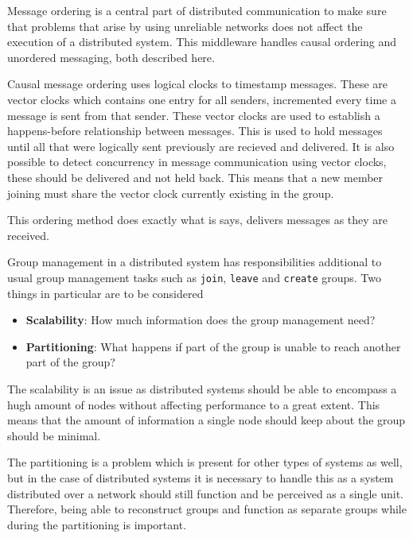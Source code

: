 
	Message ordering is a central part of distributed communication to make sure that problems that arise by using unreliable networks does not affect the execution of a distributed system.
	This middleware handles causal ordering and unordered messaging, both described here.

		Causal message ordering uses logical clocks to timestamp messages.
		These are vector clocks which contains one entry for all senders, incremented every time a message is sent from that sender.
		These vector clocks are used to establish a happens-before relationship between messages.
		This is used to hold messages until all that were logically sent previously are recieved and delivered.
		It is also possible to detect concurrency in message communication using vector clocks, these should be delivered and not held back.
		This means that a new member joining must share the vector clock currently existing in the group.

		This ordering method does exactly what is says, delivers messages as they are received.


	Group management in a distributed system has responsibilities additional to usual group management tasks such as \texttt{join}, \texttt{leave} and \texttt{create} groups.
	Two things in particular are to be considered
	\begin{itemize}
		\item \textbf{Scalability}: How much information does the group management need?
		\item \textbf{Partitioning}: What happens if part of the group is unable to reach another part of the group?
	\end{itemize}

	The scalability is an issue as distributed systems should be able to encompass a hugh amount of nodes without affecting performance to a great extent.
	This means that the amount of information a single node should keep about the group should be minimal.

	The partitioning is a problem which is present for other types of systems as well, but in the case of distributed systems it is necessary to handle this as a system distributed over a network should still function and be perceived as a single unit.
	Therefore, being able to reconstruct groups and function as separate groups while during the partitioning is important.
